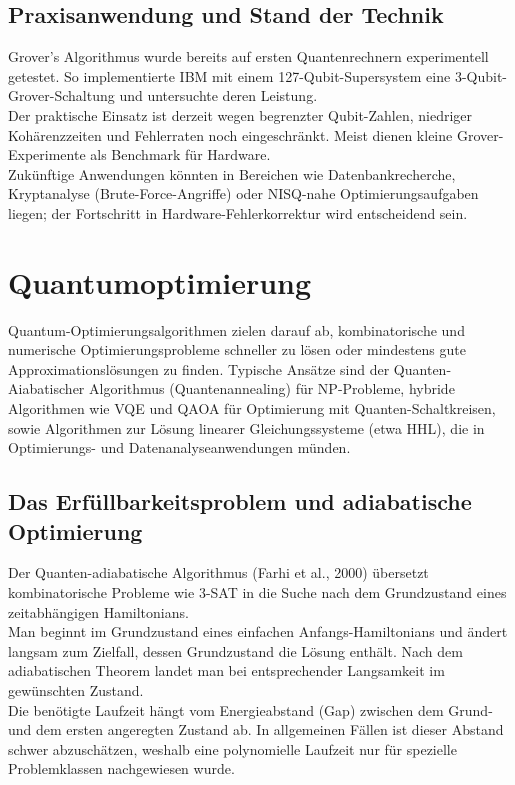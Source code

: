 \subsection{Praxisanwendung und Stand der Technik}

Grover’s Algorithmus wurde bereits auf ersten Quantenrechnern experimentell getestet. So implementierte IBM mit einem 127-Qubit-Supersystem eine 3-Qubit-Grover-Schaltung und untersuchte deren Leistung.\\
Der praktische Einsatz ist derzeit wegen begrenzter Qubit-Zahlen, niedriger Kohärenzzeiten und Fehlerraten noch eingeschränkt. Meist dienen kleine Grover-Experimente als Benchmark für Hardware.\\
Zukünftige Anwendungen könnten in Bereichen wie Datenbankrecherche, Kryptanalyse (Brute-Force-Angriffe) oder NISQ-nahe Optimierungsaufgaben liegen; der Fortschritt in Hardware-Fehlerkorrektur wird entscheidend sein.

\section{Quantumoptimierung}
Quantum-Optimierungsalgorithmen zielen darauf ab, kombinatorische und numerische Optimierungsprobleme schneller zu lösen oder mindestens gute Approximationslösungen zu finden. Typische Ansätze sind der Quanten-Aiabatischer Algorithmus (Quantenannealing) für NP-Probleme, hybride Algorithmen wie VQE und QAOA für Optimierung mit Quanten-Schaltkreisen, sowie Algorithmen zur Lösung linearer Gleichungssysteme (etwa HHL), die in Optimierungs- und Datenanalyseanwendungen münden.

\subsection{Das Erfüllbarkeitsproblem und adiabatische Optimierung}

Der Quanten-adiabatische Algorithmus (Farhi et al., 2000) übersetzt kombinatorische Probleme wie 3-SAT in die Suche nach dem Grundzustand eines zeitabhängigen Hamiltonians.\\
Man beginnt im Grundzustand eines einfachen Anfangs-Hamiltonians und ändert langsam zum Zielfall, dessen Grundzustand die Lösung enthält. Nach dem adiabatischen Theorem landet man bei entsprechender Langsamkeit im gewünschten Zustand.\\
Die benötigte Laufzeit hängt vom Energieabstand (Gap) zwischen dem Grund- und dem ersten angeregten Zustand ab. In allgemeinen Fällen ist dieser Abstand schwer abzuschätzen, weshalb eine polynomielle Laufzeit nur für spezielle Problemklassen nachgewiesen wurde.\\

